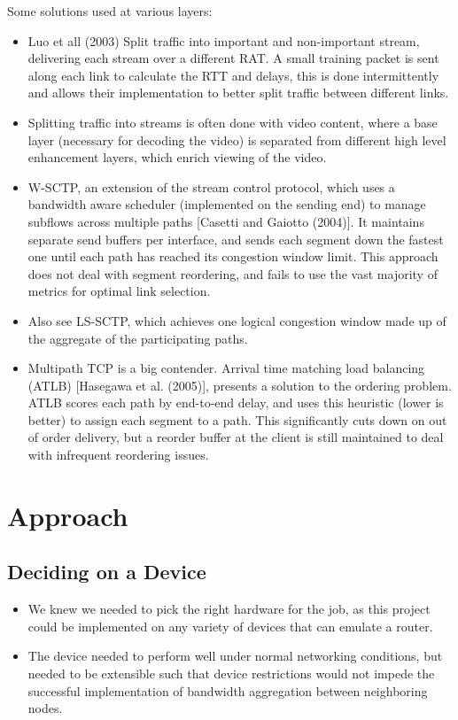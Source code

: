 \documentclass[12pt]{article}
\begin{document}
		Some solutions used at various layers:
		\begin{itemize}
			\item Luo et all (2003) Split traffic into important and non-important stream, delivering each stream over a different RAT. A small training packet is sent along each link to calculate the RTT and delays, this is done intermittently and allows their implementation to better split traffic between different links.
			\item Splitting traffic into streams is often done with video content, where a base layer (necessary for decoding the video) is separated from different high level enhancement layers, which enrich viewing of the video.
			\item W-SCTP, an extension of the stream control protocol, which uses a bandwidth aware scheduler (implemented on the sending end) to manage subflows across multiple paths [Casetti and Gaiotto (2004)]. It maintains separate send buffers per interface, and sends each segment down the fastest one until each path has reached its congestion window limit. This approach does not deal with segment reordering, and fails to use the vast majority of metrics for optimal link selection.
			\item Also see LS-SCTP, which achieves one logical congestion window made up of the aggregate of the participating paths.
			\item Multipath TCP is a big contender. Arrival time matching load balancing (ATLB) [Hasegawa et al. (2005)], presents a solution to the ordering problem. ATLB scores each path by end-to-end delay, and uses this heuristic (lower is better) to assign each segment to a path. This significantly cuts down on out of order delivery, but a reorder buffer at the client is still maintained to deal with infrequent reordering issues.
		\end{itemize}

\section{Approach}

	\subsection{Deciding on a Device}
		\begin{itemize}
			\item We knew we needed to pick the right hardware for the job, as this project could be implemented on any variety of devices that can emulate a router.
			\item The device needed to perform well under normal networking conditions, but needed to be extensible such that device restrictions would not impede the successful implementation of bandwidth aggregation between neighboring nodes.
		\end{itemize}
\end{document}
